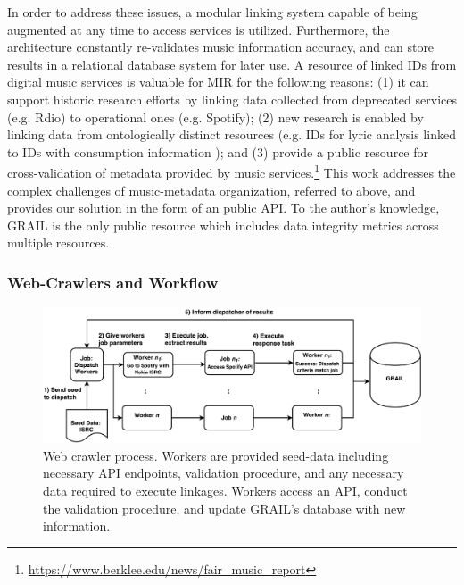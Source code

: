 \documentclass[a4paper]{article}
\begin{document}
In order to address these issues, a modular linking system capable of being augmented at any time to access services is utilized. Furthermore, the architecture constantly re-validates music information accuracy, and can store results in a relational database system for later use. A resource of linked IDs from digital music services is valuable for MIR for the following reasons: (1) it can support historic research efforts by linking data collected from deprecated services (e.g. Rdio) to operational ones (e.g. Spotify); (2) new research is enabled by linking data from ontologically distinct resources (e.g. IDs for lyric analysis linked to IDs with consumption information \cite{mckay2010evaluating}); and (3) provide a public resource for cross-validation of metadata provided by music services.\footnote{\url{https://www.berklee.edu/news/fair_music_report}} This work addresses the complex challenges of music-metadata organization, referred to above, and provides our solution in the form of an public \Gls{API}. To the author's knowledge, \Gls{GRAIL} is the only public resource which includes data integrity metrics across multiple resources.

\subsubsection{Web-Crawlers and Workflow}
\begin{figure}[h!]
\includegraphics[width=\linewidth]{crawler_workflow.png}
\caption[\Gls{GRAIL} Crawler Process]{Web crawler process. Workers are provided seed-data including necessary \Gls{API} endpoints, validation procedure, and any necessary data required to execute linkages. Workers access an \Gls{API}, conduct the validation procedure, and update \Gls{GRAIL}'s database with new information.}
\label{fig:crawl_process}
\end{figure}
\end{document}
